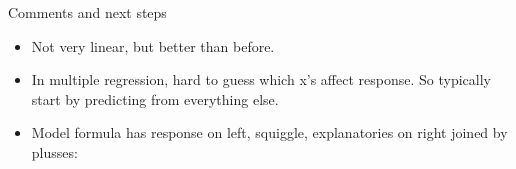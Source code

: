 \begin{frame}[fragile]{Comments and next steps}
\protect\hypertarget{comments-and-next-steps}{}
\begin{itemize}
\tightlist
\item
  Not very linear, but better than before.
\item
  In multiple regression, hard to guess which x's affect response. So
  typically start by predicting from everything else.
\item
  Model formula has response on left, squiggle, explanatories on right
  joined by plusses:
\end{itemize}

\begin{Shaded}
\begin{Highlighting}[]
\NormalTok{ \textless{}{-}}\StringTok{ }\OperatorTok{\textasciitilde{}}\StringTok{ }\OperatorTok{+}\StringTok{ }\OperatorTok{+}\StringTok{ }\OperatorTok{+}
\StringTok{  }\OperatorTok{+}\StringTok{ }\OperatorTok{+}\StringTok{ }
\end{Highlighting}
\end{Shaded}
\end{frame}

